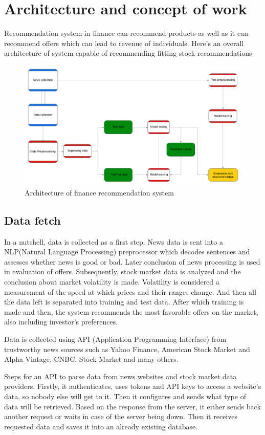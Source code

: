\documentclass[10pt,twoside,english,a4paper]{article}
\begin{document}
\section{Architecture and concept of work}
Recommendation system in finance can recommend products as well as it can recommend offers which can lead to revenue of individuals. Here's an overall architecture of system capable of recommending fitting stock recommendations

\begin{figure}[h]
\centering
\includegraphics[width=1\textwidth]{architecture_diagram}
\caption{Architecture of finance recommendation system}
\label{fig:Architecture}
\end{figure}

\subsection{Data fetch}
\par In a nutshell, data is collected as a first step. News data is sent into a NLP(Natural Language Processing) preprocessor which decodes sentences and assesses whether news is good or bad. Later conclusion of news processing is used in evaluation of offers. Subsequently, stock market data is analyzed and the conclusion about market volatility is made. Volatility is considered a measurement of the speed at which prices and their ranges change. And then all the data left is separated into training and test data. After which training is made and then, the system recommends the most favorable offers on the market, also including investor's preferences. 
\par Data is collected using API (Application Programming Interface) from trustworthy news sources such as Yahoo Finance, American Stock Market and Alpha Vintage, CNBC, Stock Market and many others.\cite{stock_comp} 
\par Steps for an API to parse data from news websites and stock market data providers. Firstly, it authenticates, uses tokens and API keys to access a website's data, so nobody else will get to it. Then it configures and sends what type of data will be retrieved. Based on the response from the server, it either sends back another request or waits in case of the server being down. Then it receives requested data and saves it into an already existing database.
\end{document}
